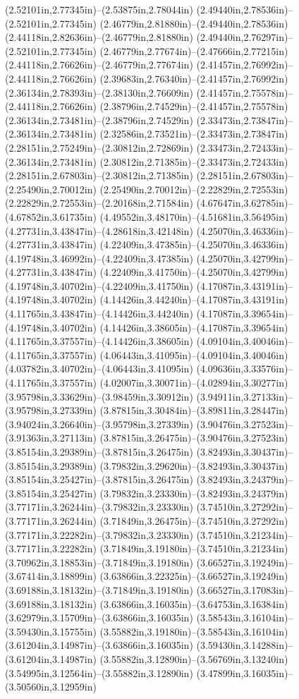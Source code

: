 (2.52101in,2.77345in)--(2.53875in,2.78044in) (2.49440in,2.78536in)--(2.52101in,2.77345in) (2.46779in,2.81880in)--(2.49440in,2.78536in) (2.44118in,2.82636in)--(2.46779in,2.81880in) (2.49440in,2.76297in)--(2.52101in,2.77345in) (2.46779in,2.77674in)--(2.47666in,2.77215in) (2.44118in,2.76626in)--(2.46779in,2.77674in) (2.41457in,2.76992in)--(2.44118in,2.76626in) (2.39683in,2.76340in)--(2.41457in,2.76992in) (2.36134in,2.78393in)--(2.38130in,2.76609in) (2.41457in,2.75578in)--(2.44118in,2.76626in) (2.38796in,2.74529in)--(2.41457in,2.75578in) (2.36134in,2.73481in)--(2.38796in,2.74529in) (2.33473in,2.73847in)--(2.36134in,2.73481in) (2.32586in,2.73521in)--(2.33473in,2.73847in) (2.28151in,2.75249in)--(2.30812in,2.72869in) (2.33473in,2.72433in)--(2.36134in,2.73481in) (2.30812in,2.71385in)--(2.33473in,2.72433in) (2.28151in,2.67803in)--(2.30812in,2.71385in) (2.28151in,2.67803in)--(2.25490in,2.70012in) (2.25490in,2.70012in)--(2.22829in,2.72553in) (2.22829in,2.72553in)--(2.20168in,2.71584in) (4.67647in,3.62785in)--(4.67852in,3.61735in) (4.49552in,3.48170in)--(4.51681in,3.56495in) (4.27731in,3.43847in)--(4.28618in,3.42148in) (4.25070in,3.46336in)--(4.27731in,3.43847in) (4.22409in,3.47385in)--(4.25070in,3.46336in) (4.19748in,3.46992in)--(4.22409in,3.47385in) (4.25070in,3.42799in)--(4.27731in,3.43847in) (4.22409in,3.41750in)--(4.25070in,3.42799in) (4.19748in,3.40702in)--(4.22409in,3.41750in) (4.17087in,3.43191in)--(4.19748in,3.40702in) (4.14426in,3.44240in)--(4.17087in,3.43191in) (4.11765in,3.43847in)--(4.14426in,3.44240in) (4.17087in,3.39654in)--(4.19748in,3.40702in) (4.14426in,3.38605in)--(4.17087in,3.39654in) (4.11765in,3.37557in)--(4.14426in,3.38605in) (4.09104in,3.40046in)--(4.11765in,3.37557in) (4.06443in,3.41095in)--(4.09104in,3.40046in) (4.03782in,3.40702in)--(4.06443in,3.41095in) (4.09636in,3.33576in)--(4.11765in,3.37557in) (4.02007in,3.30071in)--(4.02894in,3.30277in) (3.95798in,3.33629in)--(3.98459in,3.30912in) (3.94911in,3.27133in)--(3.95798in,3.27339in) (3.87815in,3.30484in)--(3.89811in,3.28447in) (3.94024in,3.26640in)--(3.95798in,3.27339in) (3.90476in,3.27523in)--(3.91363in,3.27113in) (3.87815in,3.26475in)--(3.90476in,3.27523in) (3.85154in,3.29389in)--(3.87815in,3.26475in) (3.82493in,3.30437in)--(3.85154in,3.29389in) (3.79832in,3.29620in)--(3.82493in,3.30437in) (3.85154in,3.25427in)--(3.87815in,3.26475in) (3.82493in,3.24379in)--(3.85154in,3.25427in) (3.79832in,3.23330in)--(3.82493in,3.24379in) (3.77171in,3.26244in)--(3.79832in,3.23330in) (3.74510in,3.27292in)--(3.77171in,3.26244in) (3.71849in,3.26475in)--(3.74510in,3.27292in) (3.77171in,3.22282in)--(3.79832in,3.23330in) (3.74510in,3.21234in)--(3.77171in,3.22282in) (3.71849in,3.19180in)--(3.74510in,3.21234in) (3.70962in,3.18853in)--(3.71849in,3.19180in) (3.66527in,3.19249in)--(3.67414in,3.18899in) (3.63866in,3.22325in)--(3.66527in,3.19249in) (3.69188in,3.18132in)--(3.71849in,3.19180in) (3.66527in,3.17083in)--(3.69188in,3.18132in) (3.63866in,3.16035in)--(3.64753in,3.16384in) (3.62979in,3.15709in)--(3.63866in,3.16035in) (3.58543in,3.16104in)--(3.59430in,3.15755in) (3.55882in,3.19180in)--(3.58543in,3.16104in) (3.61204in,3.14987in)--(3.63866in,3.16035in) (3.59430in,3.14288in)--(3.61204in,3.14987in) (3.55882in,3.12890in)--(3.56769in,3.13240in) (3.54995in,3.12564in)--(3.55882in,3.12890in) (3.47899in,3.16035in)--(3.50560in,3.12959in) 